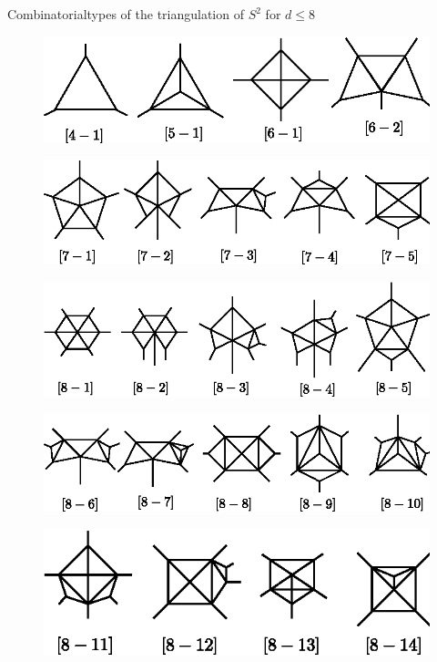 \noindent
Combinatorial\pageoriginale types of the triangulation of $S^2$ for $d
\le 8$  
\begin{figure}[H]
\centering 
\includegraphics{vol58-fig/fig58-30.eps} 
\end{figure}
\begin{figure}[H]
\centering 
\includegraphics{vol58-fig/fig58-31.eps} 
\end{figure}
\begin{figure}[H]
\centering 
\includegraphics{vol58-fig/fig58-32.eps} 
\end{figure}
\begin{figure}[H]
\centering 
\includegraphics{vol58-fig/fig58-33.eps} 
\end{figure}
\begin{figure}[H]
\centering 
\includegraphics{vol58-fig/fig58-34.eps} 
\end{figure}
